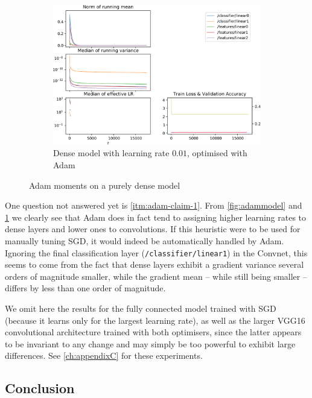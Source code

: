 \begin{figure}
    \begin{subfigure}{\textwidth}
        \centering
        \includegraphics[width=\linewidth]{gfx/diagrams/experiments/adam/fullyconnectedmodel_adam_001_0_-1.pdf}
        \caption{Dense model with learning rate $0.01$, optimised with Adam}
    \end{subfigure}
    \label{fig:fully-connected-experiment}
    \caption{Adam moments on a purely dense model}
\end{figure}

One question not answered yet is \cref{itm:adam-claim-1}. From
\cref{fig:adammodel} and \cref{fig:fully-connected-experiment} we clearly see
that Adam does in fact tend to assigning higher learning rates to dense layers
and lower ones to convolutions. If this heuristic were to be used for manually
tuning SGD, it would indeed be automatically handled by Adam. Ignoring the final
classification layer (\texttt{/classifier/linear1}) in the Convnet, this seems
to come from the fact that dense layers exhibit a gradient variance several
orders of magnitude smaller, while the gradient mean -- while still being
smaller -- differs by less than one order of magnitude.

We omit here the results for the fully connected model trained with SGD (because
it learns only for the largest learning rate), as well as the larger VGG16
convolutional architecture trained with both optimisers, since the latter
appears to be invariant to any change and may simply be too powerful to exhibit
large differences. See \cref{ch:appendixC} for these experiments.

\subsection{Conclusion}

